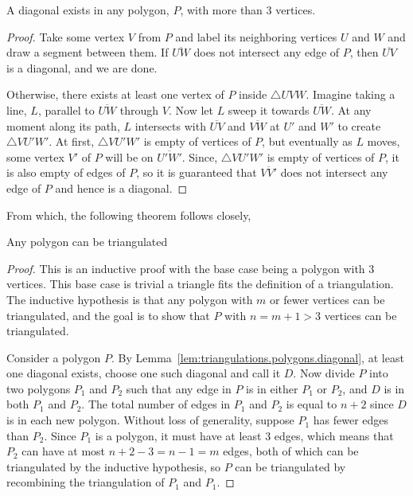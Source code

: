 
\begin{lemma}
	A diagonal exists in any polygon, $P$, with more than 3 vertices.
	\label{lem:triangulations.polygons.diagonal}
\end{lemma}
\begin{proof}
	Take some vertex $V$ from $P$ and label its neighboring vertices $U$ and $W$ and draw a segment between them.
	If $\overline{UW}$ does not intersect any edge of $P$, then $\overline{UV}$ is a diagonal, and we are done.

	Otherwise, there exists at least one vertex of $P$ inside $\triangle UVW$.
	Imagine taking a line, $L$, parallel to $\overline{UW}$ through $V$.
	Now let $L$ sweep it towards $\overline{UW}$.
	At any moment along its path, $L$ intersects with $\overline{UV}$ and $\overline{VW}$ at $U'$ and $W'$ to create $\triangle VU'W'$.
	At first, $\triangle VU'W'$ is empty of vertices of $P$, but eventually as $L$ moves, some vertex $V'$ of $P$ will be on $\overline{U'W'}$.
	Since, $\triangle VU'W'$ is empty of vertices of $P$, it is also empty of edges of $P$, so it is guaranteed that $\overline{VV'}$ does not intersect any edge of $P$ and hence is a diagonal.
\end{proof}

From which, the following theorem follows closely,

\begin{theorem}
	Any polygon can be triangulated
	\label{thrm:triangulations.polygons.any_possible}
\end{theorem}
\begin{proof}  %
	This is an inductive proof with the base case being a polygon with 3 vertices.
	This base case is trivial a triangle fits the definition of a triangulation.
	The inductive hypothesis is that any polygon with $m$ or fewer vertices can be triangulated, and the goal is to show that $P$ with $n = m+1 > 3$ vertices can be triangulated.

	Consider a polygon $P$.
	By Lemma~\ref{lem:triangulations.polygons.diagonal}, at least one diagonal exists, choose one such diagonal and call it $D$.
	Now divide $P$ into two polygons $P_1$ and $P_2$ such that any edge in $P$ is in either $P_1$ or $P_2$, and $D$ is in both $P_1$ and $P_2$.
	The total number of edges in $P_1$ and $P_2$ is equal to $n+2$ since $D$ is in each new polygon.
	Without loss of generality, suppose $P_1$ has fewer edges than $P_2$.
	Since $P_1$ is a polygon, it must have at least 3 edges, which means that $P_2$ can have at most $n + 2 - 3 = n-1 = m$ edges, both of which can be triangulated by the inductive hypothesis, so $P$ can be triangulated by recombining the triangulation of $P_1$ and $P_1$.
\end{proof}

